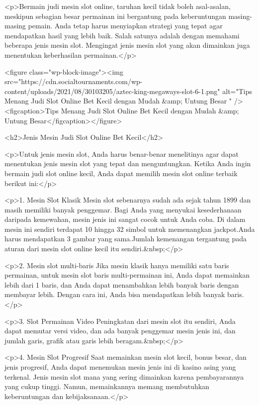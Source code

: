 {<p>Bermain judi mesin slot online, taruhan kecil tidak boleh asal-asalan, meskipun sebagian besar permainan ini bergantung pada keberuntungan masing-masing pemain. Anda tetap harus menyiapkan strategi yang tepat agar mendapatkan hasil yang lebih baik. Salah satunya adalah dengan memahami beberapa jenis mesin slot. Mengingat jenis mesin slot yang akan dimainkan juga menentukan keberhasilan permainan.</p>



<figure class="wp-block-image"><img src="https://cdn.socialtournaments.com/wp-content/uploads/2021/08/30103205/aztec-king-megaways-slot-6-1.png" alt="Tips Menang Judi Slot Online Bet Kecil dengan Mudah &amp; Untung Besar " /><figcaption>Tips Menang Judi Slot Online Bet Kecil dengan Mudah &amp; Untung Besar</figcaption></figure>



<h2>Jenis Mesin Judi Slot Online Bet Kecil</h2>



<p>Untuk jenis mesin slot, Anda harus benar-benar menelitinya agar dapat menentukan jenis mesin slot yang tepat dan menguntungkan. Ketika Anda ingin bermain judi slot online kecil, Anda dapat memilih mesin slot online terbaik berikut ini:</p>



<p>1. Mesin Slot Klasik Mesin slot sebenarnya sudah ada sejak tahun 1899 dan masih memiliki banyak penggemar. Bagi Anda yang menyukai kesederhanaan daripada kemewahan, mesin jenis ini sangat cocok untuk Anda coba. Di dalam mesin ini sendiri terdapat 10 hingga 32 simbol untuk memenangkan jackpot.Anda harus mendapatkan 3 gambar yang sama.Jumlah kemenangan tergantung pada aturan dari mesin slot online kecil itu sendiri.&nbsp;</p>



<p>2. Mesin slot multi-baris Jika mesin klasik hanya memiliki satu baris permainan, untuk mesin slot baris multi-permainan ini, Anda dapat memainkan lebih dari 1 baris, dan Anda dapat menambahkan lebih banyak baris dengan membayar lebih. Dengan cara ini, Anda bisa mendapatkan lebih banyak baris.</p>



<p>3. Slot Permainan Video Peningkatan dari mesin slot itu sendiri, Anda dapat memutar versi video, dan ada banyak penggemar mesin jenis ini, dan jumlah garis, grafik atau garis lebih beragam.&nbsp;</p>



<p>4. Mesin Slot Progresif Saat memainkan mesin slot kecil, bonus besar, dan jenis progresif, Anda dapat menemukan mesin jenis ini di kasino asing yang terkenal. Jenis mesin slot mana yang sering dimainkan karena pembayarannya yang cukup tinggi. Namun, memainkannya memang membutuhkan keberuntungan dan kebijaksanaan.</p>



}
